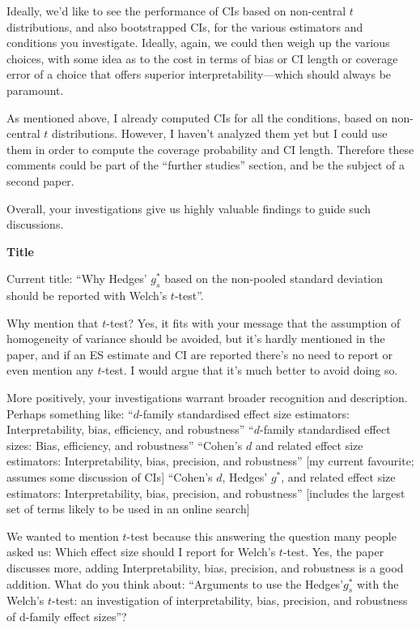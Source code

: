 \documentclass[
  12pt,
  french,
]{article}
\begin{document}
Ideally, we'd like to see the performance of CIs based on non-central
\(t\) distributions, and also bootstrapped CIs, for the various
estimators and conditions you investigate. Ideally, again, we could then
weigh up the various choices, with some idea as to the cost in terms of
bias or CI length or coverage error of a choice that offers superior
interpretability---which should always be paramount.

\color{blue} As mentioned above, I already computed CIs for all the
conditions, based on non-central \(t\) distributions. However, I haven't
analyzed them yet but I could use them in order to compute the coverage
probability and CI length. Therefore these comments could be part of the
``further studies'' section, and be the subject of a second paper.

\color{black} Overall, your investigations give us highly valuable
findings to guide such discussions.

\textbf{Title}

Current title: ``Why Hedges' \(g_s^*\) based on the non-pooled standard
deviation should be reported with Welch's \(t\)-test''.

Why mention that \(t\)-test? Yes, it fits with your message that the
assumption of homogeneity of variance should be avoided, but it's hardly
mentioned in the paper, and if an ES estimate and CI are reported
there's no need to report or even mention any \(t\)-test. I would argue
that it's much better to avoid doing so.

More positively, your investigations warrant broader recognition and
description. Perhaps something like: ``\(d\)-family standardised effect
size estimators: Interpretability, bias, efficiency, and robustness''
``\(d\)-family standardised effect sizes: Bias, efficiency, and
robustness'' ``Cohen's \(d\) and related effect size estimators:
Interpretability, bias, precision, and robustness'' {[}my current
favourite; assumes some discussion of CIs{]} ``Cohen's \(d\), Hedges'
\(g^*\), and related effect size estimators: Interpretability, bias,
precision, and robustness'' {[}includes the largest set of terms likely
to be used in an online search{]}

\color{blue} We wanted to mention \(t\)-test because this answering the
question many people asked us: Which effect size should I report for
Welch's \(t\)-test. Yes, the paper discusses more, adding
Interpretability, bias, precision, and robustness is a good addition.
What do you think about: ``Arguments to use the Hedges'\(g_s^*\) with
the Welch's \(t\)-test: an investigation of interpretability, bias,
precision, and robustness of d-family effect sizes''?
\end{document}
